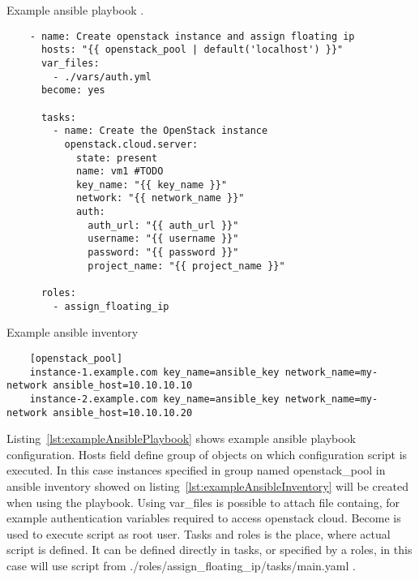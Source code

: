 \begin{listing}[htb]
    \centering
    \caption{Example ansible playbook \cite{AnsibleOpenstack}.}
    \begin{verbatim}
    - name: Create openstack instance and assign floating ip
      hosts: "{{ openstack_pool | default('localhost') }}"
      var_files:
        - ./vars/auth.yml
      become: yes
  
      tasks:
        - name: Create the OpenStack instance
          openstack.cloud.server:
            state: present
            name: vm1 #TODO
            key_name: "{{ key_name }}"
            network: "{{ network_name }}"
            auth:
              auth_url: "{{ auth_url }}"
              username: "{{ username }}"
              password: "{{ password }}"
              project_name: "{{ project_name }}"
  
      roles:
        - assign_floating_ip

    \end{verbatim}
    \label{lst:exampleAnsiblePlaybook}
\end{listing}

\begin{listing}[htb]
    \centering
    \caption{Example ansible inventory \cite{AnsibleInventory} \cite{AnsibleOpenstack} \cite{AnsibleVars}}
    \begin{verbatim}
    [openstack_pool]
    instance-1.example.com key_name=ansible_key network_name=my-network ansible_host=10.10.10.10
    instance-2.example.com key_name=ansible_key network_name=my-network ansible_host=10.10.10.20
    \end{verbatim}
    \label{lst:exampleAnsibleInventory}
\end{listing}


Listing~\ref{lst:exampleAnsiblePlaybook} shows example ansible playbook configuration. Hosts field define group of objects on which configuration script is executed. In this case instances specified in group named openstack\_pool in ansible inventory showed on listing~\ref{lst:exampleAnsibleInventory} will be created when using the playbook. Using var\_files is possible to attach file containg, for example authentication variables required to access openstack cloud. Become is used to execute script as root user. Tasks and roles is the place, where actual script is defined. It can be defined directly in tasks, or specified by a roles, in this case will use script from ./roles/assign\_floating\_ip/tasks/main.yaml \cite{AnsiblePlaybook}.


